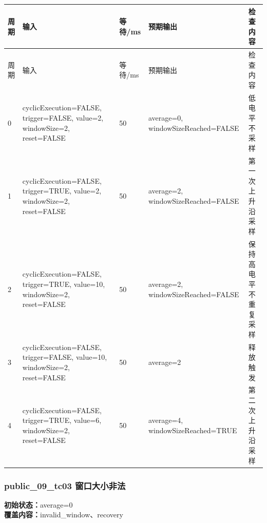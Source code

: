 \begin{longtable}{L{1.0cm}L{4.7cm}L{1.4cm}L{4.0cm}L{2.1cm}}

\toprule

周期 & 输入 & 等待/ms & 预期输出 & 检查内容\\

\midrule

\endfirsthead

\toprule

周期 & 输入 & 等待/ms & 预期输出 & 检查内容\\

\midrule

\endhead

0 & cyclicExecution=FALSE, trigger=FALSE, value=2, windowSize=2, reset=FALSE & 50 & average=0, windowSizeReached=FALSE & 低电平不采样\\

1 & cyclicExecution=FALSE, trigger=TRUE, value=2, windowSize=2, reset=FALSE & 50 & average=2, windowSizeReached=FALSE & 第一次上升沿采样\\

2 & cyclicExecution=FALSE, trigger=TRUE, value=10, windowSize=2, reset=FALSE & 50 & average=2, windowSizeReached=FALSE & 保持高电平不重复采样\\

3 & cyclicExecution=FALSE, trigger=FALSE, value=10, windowSize=2, reset=FALSE & 50 & average=2 & 释放触发\\

4 & cyclicExecution=FALSE, trigger=TRUE, value=6, windowSize=2, reset=FALSE & 50 & average=4, windowSizeReached=TRUE & 第二次上升沿采样\\

\bottomrule

\end{longtable}

\subsubsection{{\ttfamily public\_09\_tc03} 窗口大小非法}

\noindent\textbf{初始状态：}average=0\\

\textbf{覆盖内容：}invalid\_window、recovery

